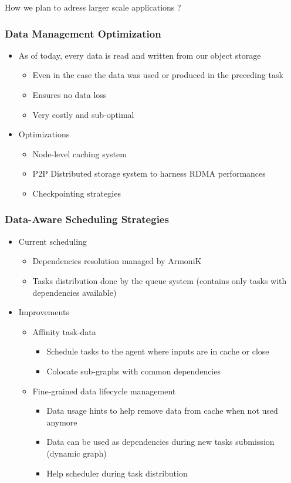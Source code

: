 \documentclass[10pt,aspectratio=1609]{beamer}
\begin{document}
\begin{section}{How we plan to adress larger scale applications ?}
  \begin{frame}
    \frametitle{Data Management Optimization}
    \begin{itemize}
      \item As of today, every data is read and written from our object storage
      \begin{itemize}
        \item Even in the case the data was used or produced in the preceding task
        \item Ensures no data loss
        \item Very costly and sub-optimal
      \end{itemize}
      \item Optimizations
      \begin{itemize}
        \item Node-level caching system
        \item P2P Distributed storage system to harness RDMA performances
        \item Checkpointing strategies
      \end{itemize}
    \end{itemize}
  \end{frame}

  \begin{frame}
    \frametitle{Data-Aware Scheduling Strategies}
    \begin{itemize}
      \item Current scheduling
      \begin{itemize}
        \item Dependencies resolution managed by ArmoniK
        \item Tasks distribution done by the queue system (contains only tasks with dependencies available)
      \end{itemize}
      \item Improvements
      \begin{itemize}
        \item Affinity task-data
        \begin{itemize}
          \item Schedule tasks to the agent where inputs are in cache or close
          \item Colocate sub-graphs with common dependencies
        \end{itemize}
        \item Fine-grained data lifecycle management
        \begin{itemize}
          \item Data usage hints to help remove data from cache when not used anymore
          \item Data can be used as dependencies during new tasks submission (dynamic graph)
          \item Help scheduler during task distribution
        \end{itemize}
      \end{itemize}
    \end{itemize}
  \end{frame}


\end{section}
\end{document}
